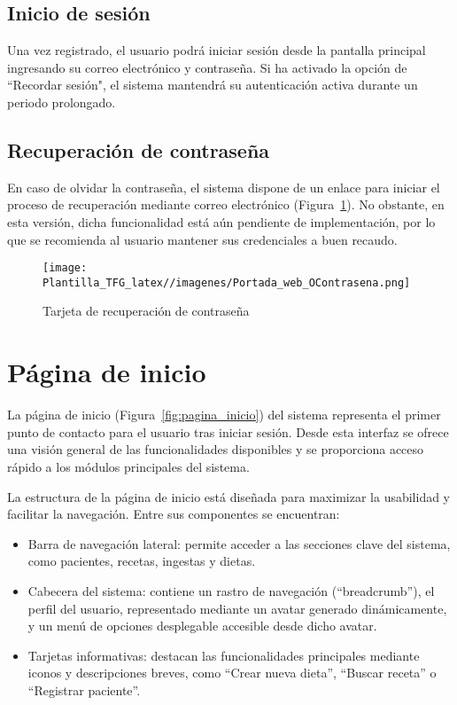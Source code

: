 \subsection{Inicio de sesión}
Una vez registrado, el usuario podrá iniciar sesión desde la pantalla principal ingresando su correo electrónico y contraseña. Si ha activado la opción de ``Recordar sesión", el sistema mantendrá su autenticación activa durante un periodo prolongado.

\subsection{Recuperación de contraseña}
En caso de olvidar la contraseña, el sistema dispone de un enlace para iniciar el proceso de recuperación mediante correo electrónico (Figura~\ref{fig:Portada_web_OContrasena}). No obstante, en esta versión, dicha funcionalidad está aún pendiente de implementación, por lo que se recomienda al usuario mantener sus credenciales a buen recaudo.
\begin{figure}[t]
    \centering
    \texttt{[image: Plantilla\_TFG\_latex//imagenes/Portada\_web\_OContrasena.png]}
    \caption{Tarjeta de recuperación de contraseña}
    \label{fig:Portada_web_OContrasena}
\end{figure}

\section{Página de inicio}
La página de inicio (Figura~\ref{fig:pagina_inicio}) del sistema representa el primer punto de contacto para el usuario tras iniciar sesión. Desde esta interfaz se ofrece una visión general de las funcionalidades disponibles y se proporciona acceso rápido a los módulos principales del sistema.

La estructura de la página de inicio está diseñada para maximizar la usabilidad y facilitar la navegación. Entre sus componentes se encuentran:

\begin{itemize}
    \item Barra de navegación lateral: permite acceder a las secciones clave del sistema, como pacientes, recetas, ingestas y dietas.
    
    \item Cabecera del sistema: contiene un rastro de navegación (``breadcrumb''), el perfil del usuario, representado mediante un avatar generado dinámicamente, y un menú de opciones desplegable accesible desde dicho avatar.

    \item Tarjetas informativas: destacan las funcionalidades principales mediante iconos y descripciones breves, como “Crear nueva dieta”, “Buscar receta” o “Registrar paciente”.
    
\end{itemize}

